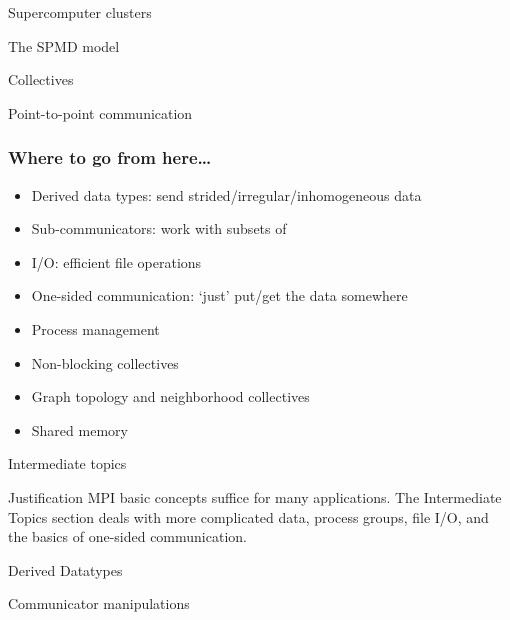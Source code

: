 \documentclass[10pt]{beamer}
\begin{document}
\renewcommand\standardversion{3}

 {Supercomputer clusters}


{} {The SPMD model}
\label{sec:spmd}


{} {Collectives}
\label{sec:collectives}


{} {Point-to-point communication}
\label{sec:ptp}


\iffalse
\begin{exerciseframe}[serialsend]
  
\end{exerciseframe}
\fi

\begin{frame}[containsverbatim]\frametitle{Where to go from here\ldots}
  \begin{itemize}
  \item Derived data types: send strided/irregular/inhomogeneous data
  \item Sub-communicators: work with subsets of 
  \item I/O: efficient file operations
  \item One-sided communication: `just' put/get the data somewhere
  \item Process management
  \item Non-blocking collectives
  \item Graph topology and neighborhood collectives
  \item Shared memory
  \end{itemize}
\end{frame}

\renewcommand\standardversion{}

{} {Intermediate topics}

\begin{frame}{Justification}
  MPI basic concepts suffice for many applications.  The Intermediate
  Topics section deals with more complicated data, process groups,
  file I/O, and the basics of one-sided communication.
\end{frame}

{} {Derived Datatypes}
\label{sec:derived}


{} {Communicator manipulations}
\label{sec:comm}

\end{document}
